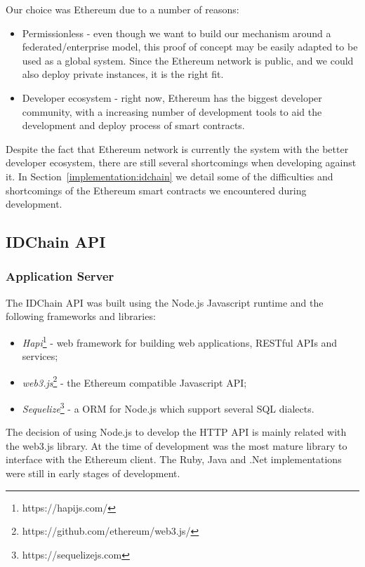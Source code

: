 Our choice was Ethereum due to a number of reasons:

\begin{itemize}
  \item Permissionless - even though we want to build our mechanism around a federated/enterprise model, this proof of concept may be easily adapted to be used as a global system.
  Since the Ethereum network is public, and we could also deploy private instances, it is the right fit.
	\item Developer ecosystem - right now, Ethereum has the biggest developer community, with a increasing number of development tools to aid the development and deploy process of smart contracts.
\end{itemize}


Despite the fact that Ethereum network is currently the system with the better developer ecosystem, there are still several shortcomings when developing against it.
In Section~\ref{implementation:idchain} we detail some of the difficulties and shortcomings of the Ethereum smart contracts we encountered during development.

\subsection{IDChain API}

\subsubsection{Application Server}

The IDChain API was built using the Node.js Javascript runtime and the following frameworks and libraries:

\begin{itemize}
  \item \textit{Hapi}\footnote{https://hapijs.com/} - web framework for building web applications, RESTful APIs and services;
  \item \textit{web3.js}\footnote{https://github.com/ethereum/web3.js/} - the Ethereum compatible Javascript API;
  \item \textit{Sequelize}\footnote{https://sequelizejs.com} - a \ac{ORM} for Node.js which support several SQL dialects.
\end{itemize}

The decision of using Node.js to develop the HTTP API is mainly related with the web3.js library.
At the time of development was the most mature library to interface with the Ethereum client.
The Ruby, Java and .Net implementations were still in early stages of development.

